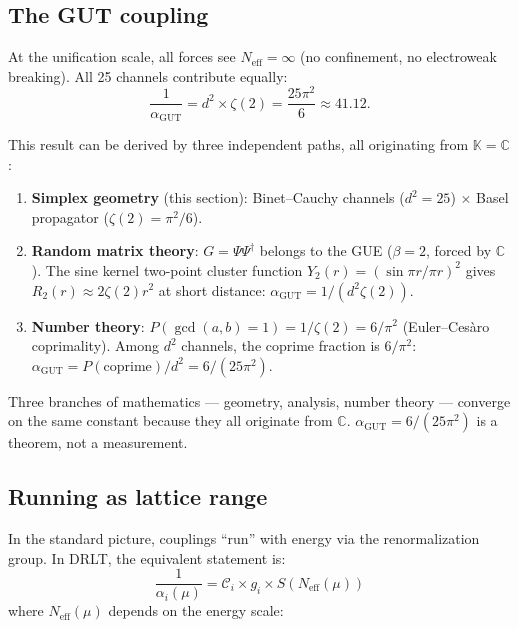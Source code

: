 \subsection{The GUT coupling}

At the unification scale, all forces see $N_\text{eff} = \infty$ (no confinement, no electroweak breaking). All 25 channels contribute equally:
\begin{equation}
\boxed{\frac{1}{\alpha_\text{GUT}} = d^2 \times \zeta(2) = \frac{25\pi^2}{6} \approx 41.12.}
\end{equation}

This result can be derived by three independent paths, all originating from $\mathbb{K} = \mathbb{C}$:

\begin{enumerate}
\item \textbf{Simplex geometry} (this section): Binet--Cauchy channels ($d^2 = 25$) $\times$ Basel propagator ($\zeta(2) = \pi^2/6$).

\item \textbf{Random matrix theory}: $G = \Psi\Psi^\dagger$ belongs to the GUE ($\beta = 2$, forced by $\mathbb{C}$). The sine kernel two-point cluster function $Y_2(r) = (\sin\pi r/\pi r)^2$ gives $R_2(r) \approx 2\zeta(2)r^2$ at short distance: $\alpha_\text{GUT} = 1/(d^2 \zeta(2))$.

\item \textbf{Number theory}: $P(\gcd(a,b) = 1) = 1/\zeta(2) = 6/\pi^2$ (Euler--Ces\`aro coprimality). Among $d^2$ channels, the coprime fraction is $6/\pi^2$: $\alpha_\text{GUT} = P(\text{coprime})/d^2 = 6/(25\pi^2)$.
\end{enumerate}

Three branches of mathematics --- geometry, analysis, number theory --- converge on the same constant because they all originate from $\mathbb{C}$. $\alpha_\text{GUT} = 6/(25\pi^2)$ is a theorem, not a measurement.

\subsection{Running as lattice range}

In the standard picture, couplings ``run'' with energy via the renormalization group. In DRLT, the equivalent statement is:
\begin{equation}
\frac{1}{\alpha_i(\mu)} = \mathcal{C}_i \times g_i \times S\!\left(N_\text{eff}(\mu)\right)
\end{equation}
where $N_\text{eff}(\mu)$ depends on the energy scale:

